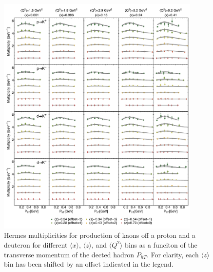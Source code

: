 \documentclass[aps,preprintnumbers,showpacs,nofootinbib,superscriptaddress,floatfix]{revtex4}
\begin{document}
\begin{figure}[h!]
\begin{center}
\includegraphics[width=0.90\textwidth]{plots/Hermes_Kaons_SCIplot_flINDEP.pdf}
\end{center}
\caption{Hermes multiplicities for production of kaons off a proton and a deuteron for different $\langle x \rangle$, $\langle z \rangle$, and $\langle Q^2 \rangle$ bins as a funciton of the transverse momentum of the dected hadron $P_{hT}$. For clarity, each $\langle z \rangle$  bin has been shifted by an offset indicated in the legend.} 
\label{f:H_kaons}
\end{figure}
\end{document}
